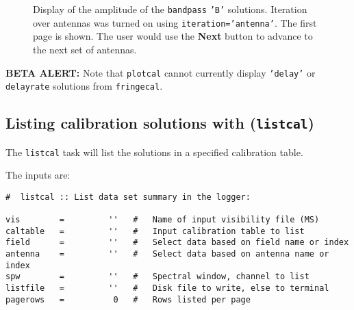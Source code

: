 \begin{figure}[h]
\begin{center}
\caption{\label{fig:plotcal_B_5921_3x2} Display of the amplitude
of the {\tt bandpass} {\tt 'B'} solutions.  Iteration over antennas
was turned on using {\tt iteration='antenna'}. The first page is shown.
The user would use the {\bf Next} button to advance to the next
set of antennas.} 
\hrulefill
\end{center}
\end{figure}


{\bf BETA ALERT:} Note that {\tt plotcal} cannot currently display
{\tt 'delay'} or {\tt delayrate} solutions from {\tt fringecal}.

\subsection{Listing calibration solutions with ({\tt listcal})}
\label{section:cal.tables.listcal}

The {\tt listcal} task will list the solutions in a specified 
calibration table.

The inputs are:
\small
\begin{verbatim}
#  listcal :: List data set summary in the logger:

vis        =         ''   #   Name of input visibility file (MS)
caltable   =         ''   #   Input calibration table to list
field      =         ''   #   Select data based on field name or index
antenna    =         ''   #   Select data based on antenna name or index
spw        =         ''   #   Spectral window, channel to list
listfile   =         ''   #   Disk file to write, else to terminal
pagerows   =          0   #   Rows listed per page
\end{verbatim}
\normalsize


